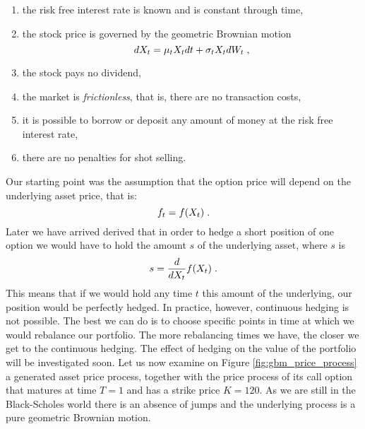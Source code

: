 \documentclass[times, utf8, diplomski]{fer}
\begin{document}
\begin{enumerate}[label=(\roman*)]
	\item the risk free interest rate is known and is constant through time,
	\item the stock price is governed by the geometric Brownian motion $$dX_t = \mu_t X_t dt + \sigma_t X_t dW_t \hspace{0.1cm},$$
	\item the stock pays no dividend,
	\item the market is \textit{frictionless}, that is, there are no transaction costs,
	\item it is possible to borrow or deposit any amount of money at the risk free interest rate,
	\item there are no penalties for shot selling.
\end{enumerate}
Our starting point was the assumption that the option price will depend on the underlying asset price, that is: $$f_t = f(X_t) \hspace{0.1cm}.$$ Later we have arrived derived that in order to hedge a short position of one option we would have to hold the amount $s$ of the underlying asset, where $s$ is 
\begin{equation} \label{eqn:s_delta}
	s = \frac{d}{dX_t}f(X_t) \hspace{0.1cm}.
\end{equation}
This means that if we would hold any time $t$ this amount of the underlying, our position would be perfectly hedged. In practice, however, continuous hedging is not possible. The best we can do is to choose specific points in time at which we would rebalance our portfolio. The more rebalancing times we have, the closer we get to the continuous hedging. The effect of hedging on the value of the portfolio will be investigated soon. Let us now examine on Figure \ref{fig:gbm_price_process} a generated asset price process, together with the price process of its call option that matures at time $T=1$ and has a strike price $K=120$. As we are still in the Black-Scholes world there is an absence of jumps and the underlying process is a pure geometric Brownian motion.
\end{document}
